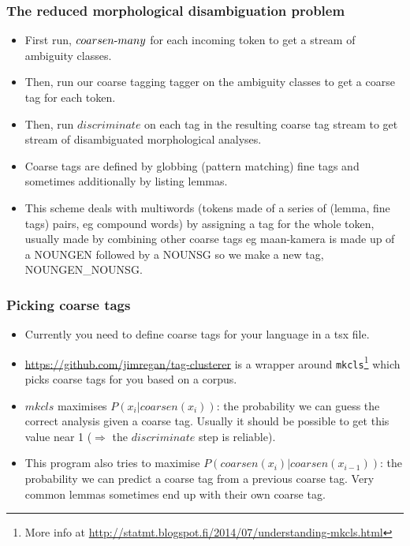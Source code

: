 \documentclass{beamer}
\begin{document}
\begin{frame}
\frametitle{The reduced morphological disambiguation problem}
\begin{itemize}

  \item First run, $coarsen\hbox{-}many$ for each incoming token to get a
    stream of ambiguity classes.

  \item Then, run our coarse tagging tagger on the ambiguity classes to get a
    coarse tag for each token.

  \item Then, run $discriminate$ on each tag in the resulting coarse tag stream
    to get stream of disambiguated morphological analyses.

  \item Coarse tags are defined by globbing (pattern matching) fine tags and
    sometimes additionally by listing lemmas.

  \item This scheme deals with multiwords (tokens made of a series of
    (lemma, fine tags) pairs, eg compound words) by assigning a tag for the
    whole token, usually made by combining other coarse tags eg maan-kamera is
    made up of a NOUNGEN followed by a NOUNSG so we make a new tag,
    NOUNGEN\_NOUNSG.

\end{itemize}
\end{frame}

\begin{frame}
\frametitle{Picking coarse tags}
\begin{itemize}

  \item Currently you need to define coarse tags for your language in a tsx
    file.

  \item \url{https://github.com/jimregan/tag-clusterer} is a wrapper around
    \texttt{mkcls}\footnote{More info at
    \url{http://statmt.blogspot.fi/2014/07/understanding-mkcls.html}} which
    picks coarse tags for you based on a corpus.

  \item $mkcls$ maximises $P(x_i|coarsen(x_i))$: the probability
    we can guess the correct analysis given a coarse tag. Usually it should be
    possible to get this value near 1 ($\Rightarrow$ the $discriminate$ step is
    reliable).

  \item This program also tries to maximise
    $P(coarsen(x_i)|coarsen(x_{i-1}))$: the probability we can predict
    a coarse tag from a previous coarse tag. Very common lemmas sometimes
    end up with their own coarse tag.

\end{itemize}
\end{frame}
\end{document}
